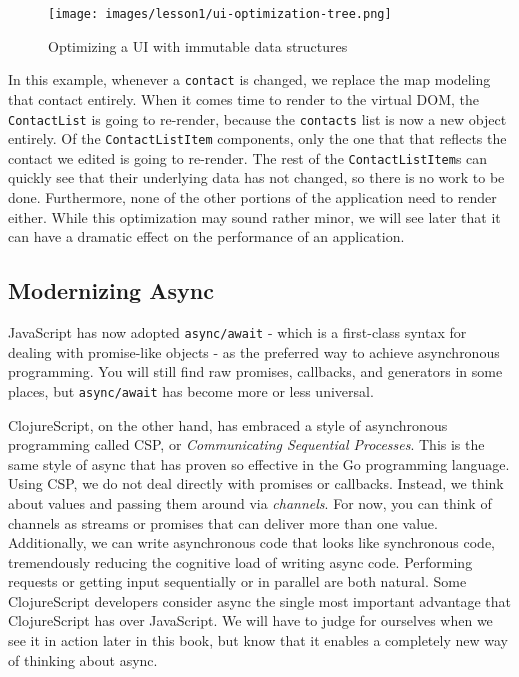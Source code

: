 \documentclass[10pt,twoside,openright]{memoir}
\begin{document}
\begin{figure}[H]
\caption{Optimizing a UI with immutable data structures}
\centering
\texttt{[image: images/lesson1/ui-optimization-tree.png]}
\end{figure}

In this example, whenever a \texttt{contact} is changed, we replace the
map modeling that contact entirely. When it comes time to render to the
virtual DOM, the \texttt{ContactList} is going to re-render, because the
\texttt{contacts} list is now a new object entirely. Of the
\texttt{ContactListItem} components, only the one that that reflects the
contact we edited is going to re-render. The rest of the
\texttt{ContactListItem}s can quickly see that their underlying data has
not changed, so there is no work to be done. Furthermore, none of the
other portions of the application need to render either. While this
optimization may sound rather minor, we will see later that it can have
a dramatic effect on the performance of an application.

\subsection{Modernizing Async}

JavaScript has now adopted \texttt{async/await} - which is a first-class
syntax for dealing with promise-like objects - as the preferred way to
achieve asynchronous programming. You will still find raw promises,
callbacks, and generators in some places, but \texttt{async/await} has
become more or less universal.

ClojureScript, on the other hand, has embraced a style of asynchronous
programming called CSP, or \emph{Communicating Sequential Processes}.
This is the same style of async that has proven so effective in the Go
programming language. Using CSP, we do not deal directly with promises
or callbacks. Instead, we think about values and passing them around via
\emph{channels}. For now, you can think of channels as streams or
promises that can deliver more than one value. Additionally, we can
write asynchronous code that looks like synchronous code, tremendously
reducing the cognitive load of writing async code. Performing requests
or getting input sequentially or in parallel are both natural. Some
ClojureScript developers consider async the single most important
advantage that ClojureScript has over JavaScript. We will have to judge
for ourselves when we see it in action later in this book, but know that
it enables a completely new way of thinking about async.
\end{document}
